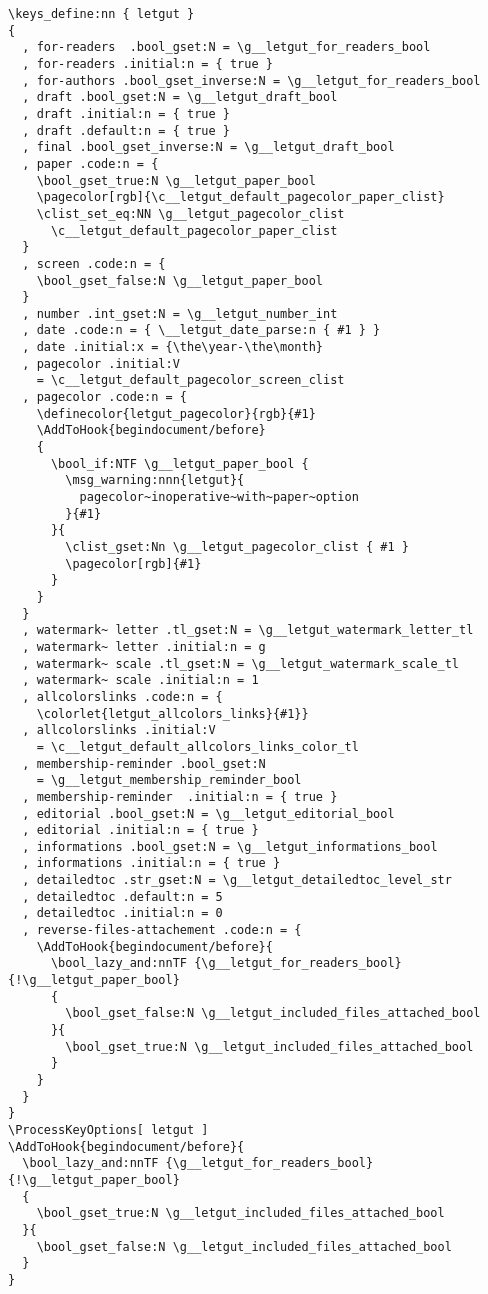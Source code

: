 \documentclass{letgut}
\begin{document}
\begin{lstlisting}
\keys_define:nn { letgut }
{
  , for-readers  .bool_gset:N = \g__letgut_for_readers_bool
  , for-readers .initial:n = { true }
  , for-authors .bool_gset_inverse:N = \g__letgut_for_readers_bool
  , draft .bool_gset:N = \g__letgut_draft_bool
  , draft .initial:n = { true }
  , draft .default:n = { true }
  , final .bool_gset_inverse:N = \g__letgut_draft_bool
  , paper .code:n = {
    \bool_gset_true:N \g__letgut_paper_bool
    \pagecolor[rgb]{\c__letgut_default_pagecolor_paper_clist}
    \clist_set_eq:NN \g__letgut_pagecolor_clist
      \c__letgut_default_pagecolor_paper_clist
  }
  , screen .code:n = {
    \bool_gset_false:N \g__letgut_paper_bool
  }
  , number .int_gset:N = \g__letgut_number_int
  , date .code:n = { \__letgut_date_parse:n { #1 } }
  , date .initial:x = {\the\year-\the\month}
  , pagecolor .initial:V
    = \c__letgut_default_pagecolor_screen_clist
  , pagecolor .code:n = {
    \definecolor{letgut_pagecolor}{rgb}{#1}
    \AddToHook{begindocument/before}
    {
      \bool_if:NTF \g__letgut_paper_bool {
        \msg_warning:nnn{letgut}{
          pagecolor~inoperative~with~paper~option
        }{#1}
      }{
        \clist_gset:Nn \g__letgut_pagecolor_clist { #1 }
        \pagecolor[rgb]{#1}
      }
    }
  }
  , watermark~ letter .tl_gset:N = \g__letgut_watermark_letter_tl
  , watermark~ letter .initial:n = g
  , watermark~ scale .tl_gset:N = \g__letgut_watermark_scale_tl
  , watermark~ scale .initial:n = 1
  , allcolorslinks .code:n = {
    \colorlet{letgut_allcolors_links}{#1}}
  , allcolorslinks .initial:V
    = \c__letgut_default_allcolors_links_color_tl
  , membership-reminder .bool_gset:N
    = \g__letgut_membership_reminder_bool
  , membership-reminder  .initial:n = { true }
  , editorial .bool_gset:N = \g__letgut_editorial_bool
  , editorial .initial:n = { true }
  , informations .bool_gset:N = \g__letgut_informations_bool
  , informations .initial:n = { true }
  , detailedtoc .str_gset:N = \g__letgut_detailedtoc_level_str
  , detailedtoc .default:n = 5
  , detailedtoc .initial:n = 0
  , reverse-files-attachement .code:n = {
    \AddToHook{begindocument/before}{
      \bool_lazy_and:nnTF {\g__letgut_for_readers_bool} {!\g__letgut_paper_bool}
      {
        \bool_gset_false:N \g__letgut_included_files_attached_bool
      }{
        \bool_gset_true:N \g__letgut_included_files_attached_bool
      }
    }
  }
}
\ProcessKeyOptions[ letgut ]
\AddToHook{begindocument/before}{
  \bool_lazy_and:nnTF {\g__letgut_for_readers_bool} {!\g__letgut_paper_bool}
  {
    \bool_gset_true:N \g__letgut_included_files_attached_bool
  }{
    \bool_gset_false:N \g__letgut_included_files_attached_bool
  }
}
\end{lstlisting}
\end{document}
